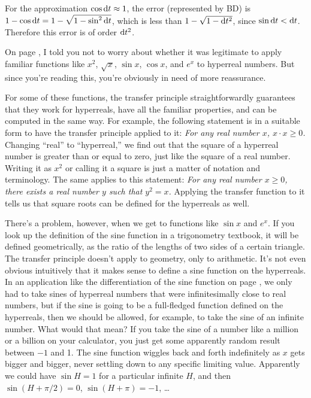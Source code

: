 For the approximation $\cos\textup{d} t\approx 1$, the error (represented
by BD) is $1-\cos\textup{d} t=1-\sqrt{1-\sin^2\textup{d} t}$, which is less
than $1-\sqrt{1-\textup{d} t^2}$, since $\sin \textup{d} t<\textup{d} t$. Therefore
this error is of order $\textup{d} t^2$.


On page \pageref{transcendentals}, I told you not to worry about whether it was legitimate to
apply familiar functions like $x^2$, $\sqrt{x}$, $\sin x$, $\cos x$, and $e^x$ to hyperreal numbers.
But since you're reading this, you're obviously in need of more reassurance.

For some of these functions, the transfer principle straightforwardly guarantees that they work
for hyperreals, have all the familiar properties, and can be computed in the same way. For example,
the following statement is in a suitable form to have the transfer principle applied to it:
\emph{
  For any real number $x$, $x\cdot x \ge0$.
}
Changing ``real'' to ``hyperreal,'' we find out that the square of a hyperreal number is
greater than or equal to zero, just like the square of a real number. Writing it as $x^2$ or
calling it a square is just a matter of notation and terminology.
The same applies to this statement:
\emph{
  For any real number $x\ge 0$, there exists a real number $y$ such that $y^2=x$.
}
Applying the transfer function to it tells us that square roots can be defined for
the hyperreals as well.

There's a problem, however, when we get to functions like $\sin x$ and $e^x$.
If you look up the definition of the sine function in a trigonometry textbook, it will
be defined geometrically, as the ratio of the lengths of two sides of a certain triangle.
The transfer principle doesn't apply to geometry, only to arithmetic. It's not even obvious
intuitively that it makes sense to define a sine function on the hyperreals. In an
application like the differentiation of the sine function on page \pageref{eg:derivative-of-sin},
we only had to take sines of hyperreal numbers that were infinitesimally close to real numbers,
but if the sine is going to be a full-fledged function defined on the hyperreals, then we should
be allowed, for example, to take the sine of an infinite number. What would that mean? If you
take the sine of a number like a million or a billion on your calculator, you just get some
apparently random result between $-1$ and 1. The sine function wiggles back and forth indefinitely
as $x$ gets bigger and bigger, never settling down to any specific limiting value. Apparently
we could have $\sin H=1$ for a particular infinite $H$, and then $\sin (H+\pi/2)=0$, $\sin(H+\pi)=-1$, \ldots


